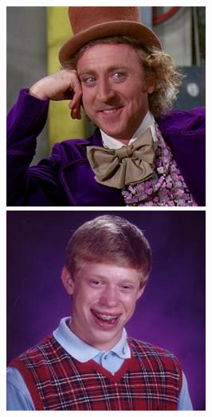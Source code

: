 \documentclass[paper=letter, fontsize=11pt]{scrartcl}
\begin{document}
\begin{figure}[h]
    \centering
    \begin{minipage}[l]{0.2\linewidth}
    \includegraphics[width=\linewidth]{img/meme2.jpg}
    \end{minipage}\hfill
    \begin{minipage}[r]{0.2\linewidth}
    \includegraphics[width=\linewidth]{img/meme3.jpg}

\end{minipage}
\end{figure}
\end{document}
